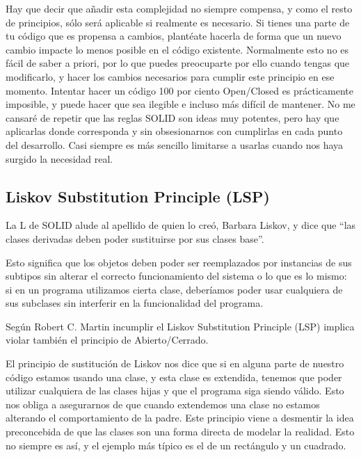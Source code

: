 \documentclass[12pt,letterpaper]{article}
\begin{document}
Hay que decir que añadir esta complejidad no siempre compensa, y como el resto
de principios, sólo será aplicable si realmente es necesario. Si tienes una parte de tu
código que es propensa a cambios, plantéate hacerla de forma que un nuevo cambio
impacte lo menos posible en el código existente. Normalmente esto no es fácil de
saber a priori, por lo que puedes preocuparte por ello cuando tengas que modificarlo,
y hacer los cambios necesarios para cumplir este principio en ese momento.
Intentar hacer un código 100 por ciento Open/Closed es prácticamente imposible, y puede
hacer que sea ilegible e incluso más difícil de mantener. No me cansaré de repetir que
las reglas SOLID son ideas muy potentes, pero hay que aplicarlas donde corresponda
y sin obsesionarnos con cumplirlas en cada punto del desarrollo. Casi siempre es más
sencillo limitarse a usarlas cuando nos haya surgido la necesidad real.

\subsection{Liskov Substitution Principle (LSP)}
La L de SOLID alude al apellido de quien lo creó, Barbara Liskov, y dice que “las clases derivadas deben poder sustituirse por sus clases base”.

Esto significa que los objetos deben poder ser reemplazados por instancias de sus subtipos sin alterar el correcto funcionamiento del sistema o lo que es lo mismo: si en un programa utilizamos cierta clase, deberíamos poder usar cualquiera de sus subclases sin interferir en la funcionalidad del programa.  

Según Robert C. Martin incumplir el Liskov Substitution Principle (LSP) implica violar también el principio de Abierto/Cerrado.


El principio de sustitución de Liskov nos dice que si en alguna parte de nuestro
código estamos usando una clase, y esta clase es extendida, tenemos que poder
utilizar cualquiera de las clases hijas y que el programa siga siendo válido. Esto
nos obliga a asegurarnos de que cuando extendemos una clase no estamos alterando
el comportamiento de la padre.
Este principio viene a desmentir la idea preconcebida de que las clases son una forma
directa de modelar la realidad. Esto no siempre es así, y el ejemplo más típico es el
de un rectángulo y un cuadrado. 
\end{document}
